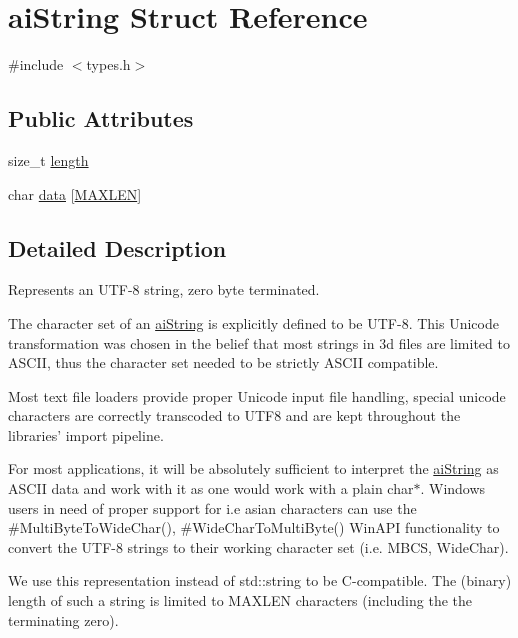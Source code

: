 \hypertarget{structai_string}{\section{ai\-String Struct Reference}
\label{structai_string}
}


{\ttfamily \#include $<$types.\-h$>$}

\subsection*{Public Attributes}
\begin{DoxyCompactItemize}
\item 
size\-\_\-t \hyperlink{structai_string_a7d77c2031ff0340746aa046f7fbcf313}{length}
\item 
char \hyperlink{structai_string_aa90b1da7d347a3dcca0a95061e6ea41d}{data} \mbox{[}\hyperlink{types_8h_ae6648cd71a8bd49d58ae8ed33ba910d1}{M\-A\-X\-L\-E\-N}\mbox{]}
\end{DoxyCompactItemize}


\subsection{Detailed Description}
Represents an U\-T\-F-\/8 string, zero byte terminated.

The character set of an \hyperlink{structai_string}{ai\-String} is explicitly defined to be U\-T\-F-\/8. This Unicode transformation was chosen in the belief that most strings in 3d files are limited to A\-S\-C\-I\-I, thus the character set needed to be strictly A\-S\-C\-I\-I compatible.

Most text file loaders provide proper Unicode input file handling, special unicode characters are correctly transcoded to U\-T\-F8 and are kept throughout the libraries' import pipeline.

For most applications, it will be absolutely sufficient to interpret the \hyperlink{structai_string}{ai\-String} as A\-S\-C\-I\-I data and work with it as one would work with a plain char$\ast$. Windows users in need of proper support for i.\-e asian characters can use the \#\-Multi\-Byte\-To\-Wide\-Char(), \#\-Wide\-Char\-To\-Multi\-Byte() Win\-A\-P\-I functionality to convert the U\-T\-F-\/8 strings to their working character set (i.\-e. M\-B\-C\-S, Wide\-Char).

We use this representation instead of std\-::string to be C-\/compatible. The (binary) length of such a string is limited to M\-A\-X\-L\-E\-N characters (including the the terminating zero). 


